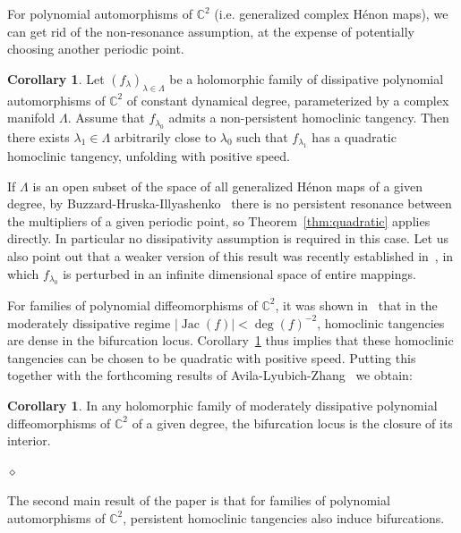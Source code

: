 \documentclass[11pt, oneside]{amsart}
\newcommand{\C}{\mathbb{C}}
\newcommand{\abs}[1]{\left\vert#1\right\vert}
\newcommand{\cd}{{\C^2}}
\newcommand{\lo}{{\lambda_0}}
\DeclareMathOperator{\jac}{Jac}
\newcommand{\diamant}{\medskip \begin{center}$\diamond$\end{center}\medskip}
\theoremstyle{remark}
\theoremstyle{definition}
\theoremstyle{theorem}
\newtheorem{mcorA}[mthmA]{Corollary}
\newcommand{\commentaire}[1]{}
\begin{document}
  
For polynomial automorphisms  of $\C^2$ (i.e. generalized  complex Hénon maps), 
we can get rid of the non-resonance assumption, 
at the expense of potentially choosing another periodic point. \commentaire{expo. rmk \#6: theorem A.2 becomes a corollary}
 
\begin{mcorA}\label{cor:quadratic_henon}
Let $(f_\lambda)_{\lambda\in \Lambda}$ be a holomorphic family of  
dissipative polynomial  
automorphisms  of $\C^2$ of constant dynamical degree,
 parameterized by a complex manifold $\Lambda$. 
Assume that $f_\lo$  admits a non-persistent homoclinic tangency. 
Then there exists $\lambda_1\in \Lambda$ 
arbitrarily close to $\lo$  such that $f_{\lambda_1}$ has   
 a quadratic homoclinic tangency,  unfolding with positive speed. 
\end{mcorA}
 
If $\Lambda$ is an open subset of 
 the space of all generalized Hénon maps of a given degree, by 
 Buzzard-Hruska-Illyashenko~\cite[Thm 1.4]{BHI} there is no persistent resonance between the multipliers of a given periodic point, 
 so Theorem~\ref{thm:quadratic} applies directly.  In particular no dissipativity assumption is required in this case. 
Let us also point out  that a weaker version of this result  was recently established %
in~\cite[Appendix]{araujo-moreira}, in which $f_{\lo}$ is perturbed in an infinite dimensional space of entire mappings. 

 
 For families of polynomial diffeomorphisms of $\cd$, 
it was shown in~\cite{tangencies}  that in the moderately dissipative regime 
$\abs{\jac(f)} < \deg(f)^{-2}$,  homoclinic tangencies are dense in the bifurcation locus.   
Corollary~\ref{cor:quadratic_henon} thus implies that these homoclinic tangencies 
can be chosen to be  quadratic   with positive speed. 
Putting  this together with the forthcoming results of 
Avila-Lyubich-Zhang~\cite{avila-lyubich-zhang} we obtain:

\begin{mcorA}\label{cor:ALZ}
In any holomorphic family of moderately dissipative polynomial  diffeomorphisms of $\C^2$ of a given degree, the bifurcation locus is the closure of its interior. 
\end{mcorA}

 
\diamant

The second main result  of the paper is  that  for families of 
polynomial automorphisms of $\C^2$, persistent homoclinic tangencies also induce bifurcations.
\end{document}
